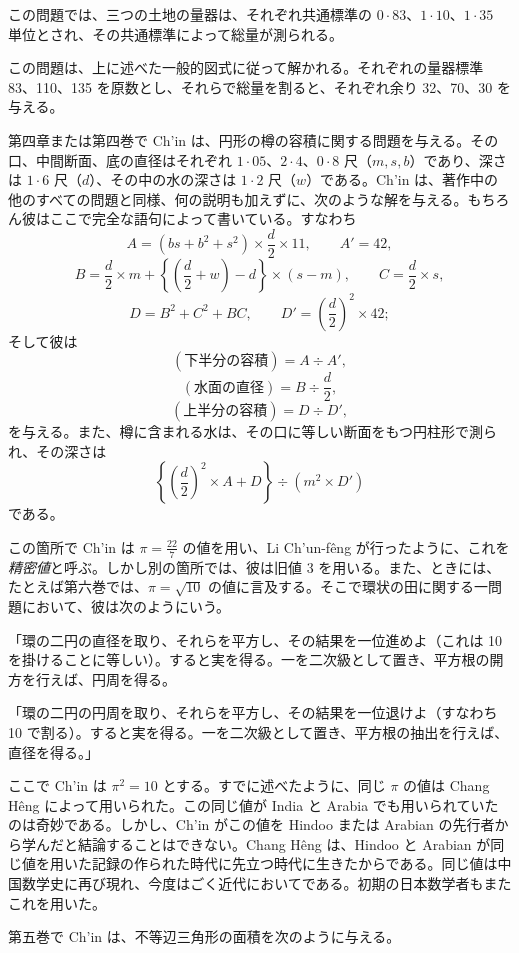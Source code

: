 \documentclass[11pt]{article}
\newcommand{\scanpage}[2]{\clearpage\setcounter{footnote}{0}\noindent{\footnotesize\color{gray}PDF #1 頁 · #2}\par\medskip}
\newcommand{\scanfooter}{}
\begin{document}
この問題では、三つの土地の量器は、それぞれ共通標準の $0\cdot83$、$1\cdot10$、$1\cdot35$ 単位とされ、その共通標準によって総量が測られる。

この問題は、上に述べた一般的図式に従って解かれる。それぞれの量器標準 83、110、135 を原数とし、それらで総量を割ると、それぞれ余り 32、70、30 を与える。

第四章または第四巻で Ch'in は、円形の樽の容積に関する問題を与える。その口、中間断面、底の直径はそれぞれ $1\cdot05$、$2\cdot4$、$0\cdot8$ 尺（$m,s,b$）であり、深さは $1\cdot6$ 尺（$d$）、その中の水の深さは $1\cdot2$ 尺（$w$）である。Ch'in は、著作中の他のすべての問題と同様、何の説明も加えずに、次のような解を与える。もちろん彼はここで完全な語句によって書いている。すなわち
\[
A=(bs+b^2+s^2)\times\frac d2\times11,\qquad A'=42,
\]
\[
B=\frac d2\times m+\left\{\left(\frac d2+w\right)-d\right\}\times(s-m),
\qquad C=\frac d2\times s,
\]
\[
D=B^2+C^2+BC,\qquad D'=\left(\frac d2\right)^2\times42;
\]
そして彼は
\[
(\text{下半分の容積})=A\div A',
\]
\[
(\text{水面の直径})=B\div\frac d2,
\]
\[
(\text{上半分の容積})=D\div D',
\]
を与える。また、樽に含まれる水は、その口に等しい断面をもつ円柱形で測られ、その深さは
\[
\left\{\left(\frac d2\right)^2\times A+D\right\}\div(m^2\times D')
\]
である。
\scanfooter

\scanpage{0084}{第11章、印刷頁70}
この箇所で Ch'in は $\pi=\frac{22}{7}$ の値を用い、Li Ch'un-fêng が行ったように、これを\emph{精密値}と呼ぶ。しかし別の箇所では、彼は旧値 3 を用いる。また、ときには、たとえば第六巻では、$\pi=\sqrt{10}$ の値に言及する。そこで環状の田に関する一問題において、彼は次のようにいう。

「環の二円の直径を取り、それらを平方し、その結果を一位進めよ（これは 10 を掛けることに等しい）。すると実を得る。一を二次級として置き、平方根の開方を行えば、円周を得る。

「環の二円の円周を取り、それらを平方し、その結果を一位退けよ（すなわち 10 で割る）。すると実を得る。一を二次級として置き、平方根の抽出を行えば、直径を得る。」

ここで Ch'in は $\pi^2=10$ とする。すでに述べたように、同じ $\pi$ の値は Chang Hêng によって用いられた。この同じ値が India と Arabia でも用いられていたのは奇妙である。しかし、Ch'in がこの値を Hindoo または Arabian の先行者から学んだと結論することはできない。Chang Hêng は、Hindoo と Arabian が同じ値を用いた記録の作られた時代に先立つ時代に生きたからである。同じ値は中国数学史に再び現れ、今度はごく近代においてである。初期の日本数学者もまたこれを用いた。

第五巻で Ch'in は、不等辺三角形の面積を次のように与える。
\end{document}
